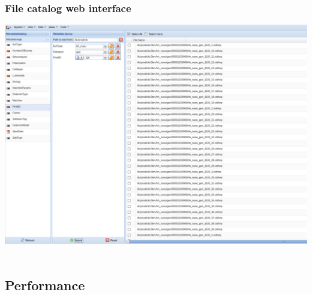 \documentclass[10pt,table,dvipsnames]{beamer}
\begin{document}
\begin{frame}
  \frametitle{File catalog web interface}
\centering
\includegraphics[width=.9\textwidth]{WebFC}~\\
\end{frame}

\subsection{Performance}
\label{sec:prefsfc}
\end{document}
